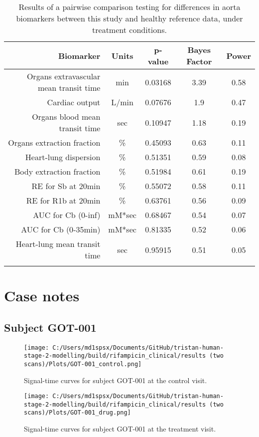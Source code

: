 \documentclass{epflreport}%
\begin{document}
\begin{longtable}{rcccc}%
\hline%
Biomarker&Units&p{-}value&Bayes Factor&Power\\%
\hline%
Organs extravascular mean transit time&min&0.03168&3.39&0.58\\%
Cardiac output&L/min&0.07676&1.9&0.47\\%
Organs blood mean transit time&sec&0.10947&1.18&0.19\\%
Organs extraction fraction&\%&0.45093&0.63&0.11\\%
Heart{-}lung dispersion&\%&0.51351&0.59&0.08\\%
Body extraction fraction&\%&0.51984&0.61&0.19\\%
RE for Sb at 20min&\%&0.55072&0.58&0.11\\%
RE for R1b at 20min&\%&0.63761&0.56&0.09\\%
AUC for Cb (0{-}inf)&mM*sec&0.68467&0.54&0.07\\%
AUC for Cb (0{-}35min)&mM*sec&0.81335&0.52&0.06\\%
Heart{-}lung mean transit time&sec&0.95915&0.51&0.05\\%
\hline%
\caption{Results of a pairwise comparison testing for differences in aorta biomarkers between this study and healthy reference data, under treatment conditions.} \\%
\end{longtable}%
\clearpage%
\section{Case notes}%
\label{sec:Casenotes}%

%
\subsection{Subject GOT{-}001}%
\label{subsec:SubjectGOT{-}001}%

%


\begin{figure}[h!]%
\centering%
\texttt{[image: C:/Users/md1spsx/Documents/GitHub/tristan-human-stage-2-modelling/build/rifampicin\_clinical/results (two scans)/Plots/GOT-001\_control.png]}%
\caption{Signal{-}time curves for subject GOT{-}001 at the control visit.}%
\end{figure}

%


\begin{figure}[h!]%
\centering%
\texttt{[image: C:/Users/md1spsx/Documents/GitHub/tristan-human-stage-2-modelling/build/rifampicin\_clinical/results (two scans)/Plots/GOT-001\_drug.png]}%
\caption{Signal{-}time curves for subject GOT{-}001 at the treatment visit.}%
\end{figure}
\end{document}
